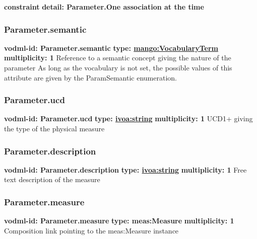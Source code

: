     \noindent \textbf{constraint} \newline
    \indent    \textbf{detail: Parameter.One association at the time
 }\newline


    \subsubsection{Parameter.semantic}
      \textbf{vodml-id: Parameter.semantic} \newline
      \textbf{type: \hyperref[sect:VocabularyTerm]{mango:VocabularyTerm}} \newline
      \textbf{multiplicity: 1} \newline 
      Reference to a semantic concept giving the nature of the parameter As long as the vocabulary is not set, the possible values of this attribute are given by the ParamSemantic enumeration.

    \subsubsection{Parameter.ucd}
      \textbf{vodml-id: Parameter.ucd} \newline
      \textbf{type: \hyperref[sect:ivoa]{ivoa:string}} \newline
      \textbf{multiplicity: 1} \newline 
      UCD1+ giving the type of the physical measure

    \subsubsection{Parameter.description}
      \textbf{vodml-id: Parameter.description} \newline
      \textbf{type: \hyperref[sect:ivoa]{ivoa:string}} \newline
      \textbf{multiplicity: 1} \newline 
      Free text description of the measure

    \subsubsection{Parameter.measure}
      \textbf{vodml-id: Parameter.measure} \newline
      \textbf{type: meas:Measure} \newline
      \textbf{multiplicity: 1} \newline 
      Composition link pointing to the meas:Measure instance


